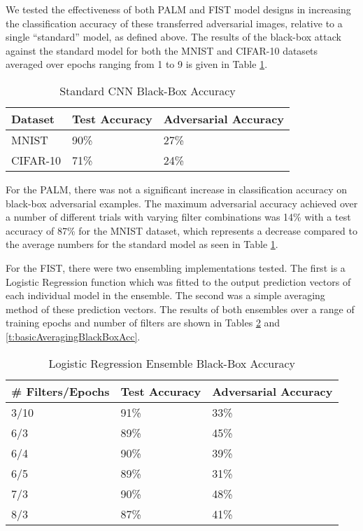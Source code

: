 We tested the effectiveness of both PALM and FIST model designs in increasing the classification accuracy of these transferred adversarial images, relative to a single ``standard'' model, as defined above.
The results of the black-box attack against the standard model for both the MNIST and CIFAR-10 datasets averaged over epochs ranging from 1 to 9 is given in Table \ref{t:standardBlackBoxAcc}.
\begin{table}
    \begin{center}
        \caption{Standard CNN Black-Box Accuracy}
        \label{t:standardBlackBoxAcc}
        \begin{tabular}{l|l|l}\hline
        \textbf{Dataset} & \textbf{Test Accuracy} & \textbf{Adversarial Accuracy}\\\hline
        MNIST & 90\% & 27\% \\\hline
        CIFAR-10 & 71\% & 24\% \\\hline
        \end{tabular}
    \end{center}
\end{table}

For the PALM, there was not a significant increase in classification accuracy on black-box adversarial examples.
The maximum adversarial accuracy achieved over a number of different trials with varying filter combinations was 14\% with a test accuracy of 87\% for the MNIST dataset, which represents a decrease compared to the average numbers for the standard model as seen in Table \ref{t:standardBlackBoxAcc}.

For the FIST, there were two ensembling implementations tested.
The first is a Logistic Regression function which was fitted to the output prediction vectors of each individual model in the ensemble.
The second was a simple averaging method of these prediction vectors.
The results of both ensembles over a range of training epochs and number of filters are shown in Tables \ref{t:logisticRegressionBlackBoxAcc} and \ref{t:basicAveragingBlackBoxAcc}.

\begin{table}
    \begin{center}
        \caption{Logistic Regression Ensemble Black-Box Accuracy}
        \label{t:logisticRegressionBlackBoxAcc}
        \begin{tabular}{l|l|l}\hline
        \textbf{\# Filters/Epochs} & \textbf{Test Accuracy} & \textbf{Adversarial Accuracy}\\\hline
        3/10 & 91\% & 33\% \\\hline
        6/3 & 89\% & 45\% \\\hline
        6/4 & 90\% & 39\% \\\hline
        6/5 & 89\% & 31\% \\\hline
        7/3 & 90\% & 48\% \\\hline
        8/3 & 87\% & 41\% \\\hline
        \end{tabular}
    \end{center}
\end{table}

